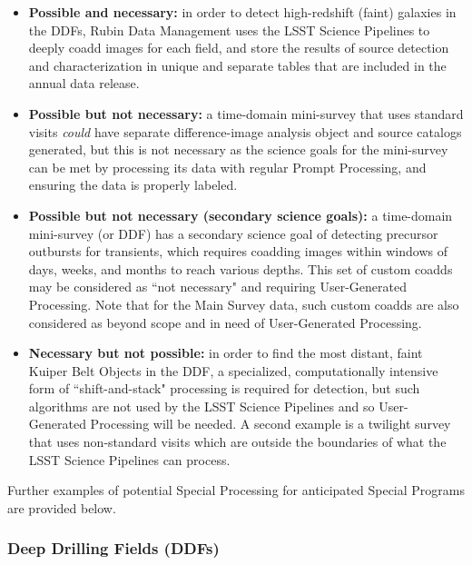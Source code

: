 \begin{itemize}

\item \textbf{Possible and necessary:}
in order to detect high-redshift (faint) galaxies in the DDFs,
Rubin Data Management uses the LSST Science Pipelines to deeply
coadd images for each field, and store the results of source
detection and characterization in unique and separate tables that
are included in the annual data release.

\item \textbf{Possible but not necessary:}
a time-domain mini-survey that uses standard visits \emph{could}
have separate difference-image analysis object and source catalogs
generated, but this is not necessary as the science goals for the
mini-survey can be met by processing its data with regular Prompt
Processing, and ensuring the data is properly labeled.

\item \textbf{Possible but not necessary (secondary science goals):}
a time-domain mini-survey (or DDF) has a secondary science goal of detecting
precursor outbursts for transients, which requires coadding images
within windows of days, weeks, and months to reach various depths.
This set of custom coadds may be considered as ``not necessary" and requiring 
User-Generated Processing.
Note that for the Main Survey data, such custom coadds are also considered 
as beyond scope and in need of User-Generated Processing.

\item \textbf{Necessary but not possible:}
in order to find the most distant, faint Kuiper Belt Objects in the DDF,
a specialized, computationally intensive form of ``shift-and-stack" processing
is required for detection, but such algorithms are not used by the 
LSST Science Pipelines and so User-Generated Processing will be needed.
A second example is a twilight survey that uses non-standard visits 
which are outside the boundaries of what the LSST Science Pipelines can process.

\end{itemize}

Further examples of potential Special Processing for anticipated Special Programs are provided below.

\subsubsection{Deep Drilling Fields (DDFs)}\label{sssec:proc_special_ddf}

